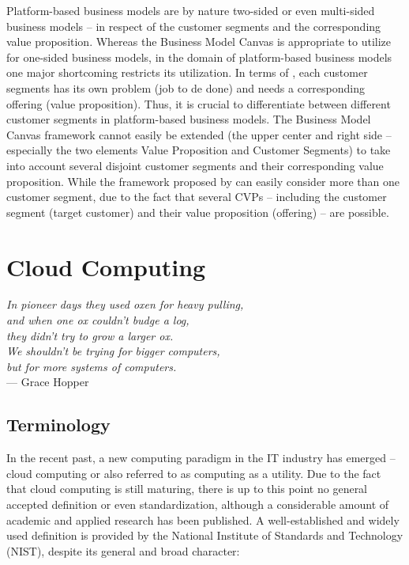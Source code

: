 Platform-based business models are by nature two-sided or even multi-sided business models -- in respect of the customer segments and the corresponding value proposition. Whereas the Business Model Canvas is appropriate to utilize for one-sided business models, in the domain of platform-based business models one major shortcoming restricts its utilization. In terms of \citet{Johnson2008}, each customer segments has its own problem (job to de done) and needs a corresponding offering (value proposition). Thus, it is crucial to differentiate between different customer segments in platform-based business models. The Business Model Canvas framework cannot easily be extended (the upper center and right side -- especially the two elements Value Proposition and Customer Segments) to take into account several disjoint customer segments and their corresponding value proposition. While the framework proposed by \citet{Johnson2008} can easily consider more than one customer segment, due to the fact that several \acp{CVP} -- including the customer segment (target customer) and their value proposition (offering) -- are possible.

\section{Cloud Computing}\label{ch:tf:paas}
\begin{flushright}{\slshape 
	In pioneer days they used oxen for heavy pulling,\\
	and when one ox couldn't budge a log,\\
	they didn't try to grow a larger ox.\\
	We shouldn't be trying for bigger computers,\\
	but for more systems of computers.} \\ \medskip
	--- Grace Hopper
\end{flushright}

\subsection{Terminology}

In the recent past, a new computing paradigm in the IT industry has emerged -- cloud computing or also referred to as computing as a utility. Due to the fact that cloud computing is still maturing, there is up to this point no general accepted definition or even standardization, although a considerable amount of academic and applied research has been published. A well-established and widely used definition is provided by the National Institute of Standards and Technology (NIST), despite its general and broad character:

